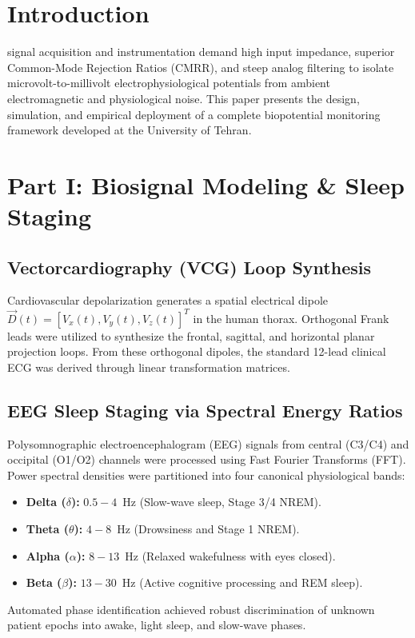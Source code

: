 \documentclass[journal,10pt,twocolumn]{IEEEtran}
\begin{document}
\section{Introduction}
 signal acquisition and instrumentation demand high input impedance, superior Common-Mode Rejection Ratios (CMRR), and steep analog filtering to isolate microvolt-to-millivolt electrophysiological potentials from ambient electromagnetic and physiological noise. This paper presents the design, simulation, and empirical deployment of a complete biopotential monitoring framework developed at the University of Tehran.

\section{Part I: Biosignal Modeling \& Sleep Staging}
\subsection{Vectorcardiography (VCG) Loop Synthesis}
Cardiovascular depolarization generates a spatial electrical dipole $\vec{D}(t) = [V_x(t), V_y(t), V_z(t)]^T$ in the human thorax. Orthogonal Frank leads were utilized to synthesize the frontal, sagittal, and horizontal planar projection loops. From these orthogonal dipoles, the standard 12-lead clinical ECG was derived through linear transformation matrices.

\subsection{EEG Sleep Staging via Spectral Energy Ratios}
Polysomnographic electroencephalogram (EEG) signals from central (C3/C4) and occipital (O1/O2) channels were processed using Fast Fourier Transforms (FFT). Power spectral densities were partitioned into four canonical physiological bands:
\begin{itemize}
    \item \textbf{Delta ($\delta$):} $0.5 - 4$~Hz (Slow-wave sleep, Stage 3/4 NREM).
    \item \textbf{Theta ($\theta$):} $4 - 8$~Hz (Drowsiness and Stage 1 NREM).
    \item \textbf{Alpha ($\alpha$):} $8 - 13$~Hz (Relaxed wakefulness with eyes closed).
    \item \textbf{Beta ($\beta$):} $13 - 30$~Hz (Active cognitive processing and REM sleep).
\end{itemize}
Automated phase identification achieved robust discrimination of unknown patient epochs into awake, light sleep, and slow-wave phases.
\end{document}
